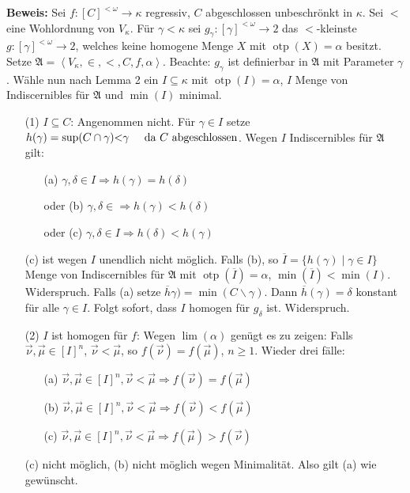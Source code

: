 \documentclass[a4paper,fontsize=11pt]{scrartcl}
\newcommand{\mathnode}[2]{%
  \mathord{\tikz[baseline=(#1.base), inner sep = 0pt]{\node (#1) {$#2$};}}}
\newcommand{\otp}{\operatorname{otp}}
\begin{document}
{\bf Beweis:} Sei $f:[C]^{<\omega} \rightarrow \kappa$ regressiv, $C$
abgeschlossen unbeschrönkt in $\kappa$. Sei $<$ eine Wohlordnung von
$V_\kappa$. Für $\gamma < \kappa$ sei $g_\gamma : [\gamma]^{<\omega}
\rightarrow 2$ das $<$-kleinste $g : [\gamma]^{<\omega} \rightarrow
2$, welches keine homogene Menge $X$ mit $\otp(X) = \alpha$
besitzt. Setze $\mathfrak{A} = \left< V_\kappa, \in, <, C, f, \alpha
\right>$. Beachte: $g_\gamma$ ist definierbar in $\mathfrak{A}$ mit
Parameter $\gamma$. Wähle nun nach Lemma 2 ein $I \subseteq \kappa$
mit $\otp(I) = \alpha$, $I$ Menge von Indiscernibles für
$\mathfrak{A}$ und $\min(I)$ minimal.
\begin{itemize}
  \item[(1)] $I\subseteq C$: \newline Angenommen nicht. Für $\gamma\in
    I$ setze $h(\gamma) = \sup(C\cap\gamma) \mathnode{m1}{<}
    \gamma\phantom{aa}\mathnode{m2}{\mbox{ da }}C\mbox{
        abgeschlossen}$. Wegen $I$ Indiscernibles für $\mathfrak{A}$
      gilt:
      \begin{itemize}
        \item[(a)] $\gamma,\delta\in I \Rightarrow h(\gamma) = h(\delta)$
        \item[oder (b)] $\gamma,\delta\in \Rightarrow h(\gamma) < h(\delta)$
        \item[oder (c)] $\gamma,\delta\in I \Rightarrow h(\delta) <
          h(\gamma)$
      \end{itemize}
      (c) ist wegen $I$ unendlich nicht möglich. Falls
      (b), so $\overline{I} = \{h(\gamma) \mid \gamma \in I\}$ Menge von
      Indiscernibles für $\mathfrak{A}$ mit $\otp(\overline{I}) =
      \alpha$, $\min(\overline{I}) < \min(I)$. Widerspruch. Falls (a)
      setze $\overline{h}\gamma) = \min(C\backslash\gamma)$. Dann
      $\overline{h}(\gamma) = \delta$ konstant für alle $\gamma \in
      I$. Folgt sofort, dass $I$ homogen für $g_\delta$
      ist. Widerspruch. 
    \item[(2)] $I$ ist homogen für $f$: \newline Wegen $\lim(\alpha)$
      genügt es zu zeigen: Falls $\vec{\nu},\vec{\mu}\in [I]^n$,
      $\vec{\nu} < \vec{\mu}$, so $f(\vec{\nu}) = f(\vec{\mu})$, $n\ge
      1$. Wieder drei fälle:
      \begin{itemize}
        \item[(a)] $\vec{\nu}, \vec{\mu} \in [I]^n, \vec{\nu} < \vec{\mu} \Rightarrow f(\vec{\nu}) = f(\vec{\mu})$
        \item[(b)] $\vec{\nu}, \vec{\mu} \in [I]^n, \vec{\nu} < \vec{\mu} \Rightarrow f(\vec{\nu}) < f(\vec{\mu})$
        \item[(c)] $\vec{\nu}, \vec{\mu} \in [I]^n, \vec{\nu} < \vec{\mu} \Rightarrow f(\vec{\mu}) > f(\vec{\nu})$          
      \end{itemize}
      (c) nicht möglich, (b) nicht möglich wegen Minimalität. Also
      gilt (a) wie gewünscht.
\end{itemize}
\end{document}
